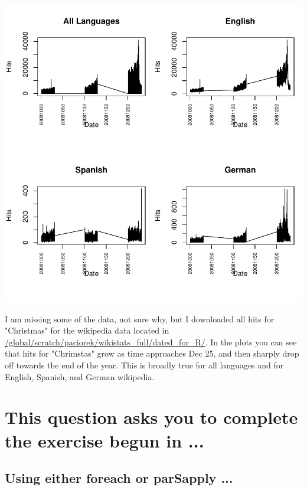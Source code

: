 \documentclass{article}\usepackage[]{graphicx}\usepackage[]{color}
\makeatletter
\def\maxwidth{ %
  \ifdim\Gin@nat@width>\linewidth
    \linewidth
  \else
    \Gin@nat@width
  \fi
}
\newenvironment{knitrout}{}{} %
\makeatother
\begin{document}
\begin{knitrout}
\includegraphics[width=\maxwidth]{figure/unnamed-chunk-6-1} 

\end{knitrout}

I am missing some of the data, not sure why, but I downloaded all hits for "Christmas" for the wikipedia data located in \url{/global/scratch/paciorek/wikistats_full/dated_for_R/}. In the plots you can see that hits for "Chrimstas" grow as time approaches Dec 25, and then sharply drop off towards the end of the year. This is broadly true for all languages and for English, Spanish, and German wikipedia. 

\section{This question asks you to complete the exercise begun in ...}


\subsection{Using either foreach or parSapply ...}
\end{document}
